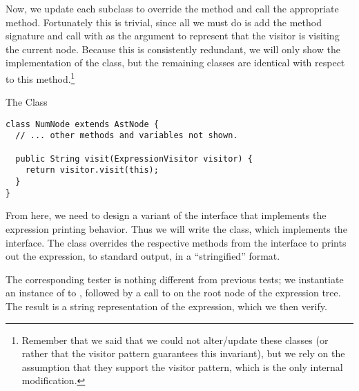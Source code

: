 Now, we update each subclass to override the  method and call the appropriate  method. Fortunately this is trivial, since all we must do is add the method signature and call  with  as the argument to represent that the visitor is visiting the current node. Because this is consistently redundant, we will only show the implementation of the  class, but the remaining classes are identical with respect to this method.\footnote{Remember that we said that we could not alter/update these classes (or rather that the visitor pattern guarantees this invariant), but we rely on the assumption that they support the visitor pattern, which is the only internal modification.}

\begin{cl}[]{The  Class}
\begin{lstlisting}[language=MyJava]
class NumNode extends AstNode {
  // ... other methods and variables not shown.

  public String visit(ExpressionVisitor visitor) {
    return visitor.visit(this);
  }
}
\end{lstlisting}
\end{cl}

From here, we need to design a variant of the interface that implements the expression printing behavior. Thus we will write the  class, which implements the  interface. The  class overrides the respective methods from the  interface to prints out the expression, to standard output, in a ``stringified'' format.

The corresponding tester is nothing different from previous tests; we instantiate an instance of  to , followed by a call to  on the root node of the expression tree. The result is a string representation of the expression, which we then verify.

